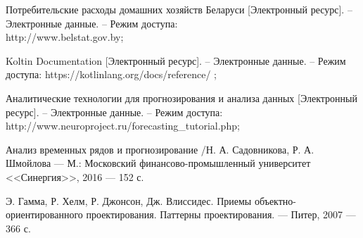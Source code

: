 
\begin{enumerate}[label={[\arabic*]}]
  \item Потребительские расходы домашних хозяйств Беларуси [Электронный ресурс]. 
  – Электронные данные. – Режим доступа: \\http://www.belstat.gov.by;
  \item Koltin Documentation [Электронный ресурс]. 
  – Электронные данные. – Режим доступа: https://kotlinlang.org/docs/reference/ ;
  \item Аналитические технологии для прогнозирования и анализа данных [Электронный ресурс]. 
  – Электронные данные. – Режим доступа: \\http://www.neuroproject.ru/forecasting\_tutorial.php;
  \item Анализ временных рядов и прогнозирование /Н. А. Садовникова, Р. А. Шмойлова 
  --- М.: Московский финансово-промышленный университет 
  <<Синергия>>, 2016 --- 152 с.
  \item Э. Гамма, Р. Хелм, Р. Джонсон, Дж. Влиссидес. Приемы
  объектно-ориентированного проектирования. Паттерны проектирования. --- Питер,
  2007 --- 366 с.
  
\end{enumerate}